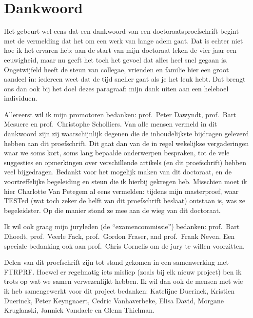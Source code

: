 \documentclass[main]{subfiles}
\begin{document}

\chapter{Dankwoord}\label{ch:dankwoord}

Het gebeurt wel eens dat een dankwoord van een doctoraatsproefschrift begint met de vermelding dat het om een werk van lange adem gaat.
Dat is echter niet hoe ik het ervaren heb: aan de start van mijn doctoraat leken de vier jaar een eeuwigheid, maar nu geeft het toch het gevoel dat alles heel snel gegaan is.
Ongetwijfeld heeft de steun van collegae, vrienden en familie hier een groot aandeel in: iedereen weet dat de tijd sneller gaat als je het leuk hebt.
Dat brengt ons dan ook bij het doel dezes paragraaf: mijn dank uiten aan een heleboel individuen.

Allereerst wil ik mijn promotoren bedanken: prof.\ Peter Dawyndt, prof.\ Bart Mesuere en prof.\ Christophe Scholliers.
Van alle mensen vermeld in dit dankwoord zijn zij waarschijnlijk degenen die de inhoudelijkste bijdragen geleverd hebben aan dit proefschrift.
Dit gaat dan van de in regel wekelijkse vergaderingen waar we soms kort, soms lang bepaalde onderwerpen bespraken, tot de vele suggesties en opmerkingen over verschillende artikels (en dit proefschrift) hebben veel bijgedragen.
Bedankt voor het mogelijk maken van dit doctoraat, en de voortreffelijke begeleiding en steun die ik hierbij gekregen heb.
Misschien moet ik hier Charlotte Van Petegem al eens vermelden: tijdens mijn masterproef, waar TESTed (wat toch zeker de helft van dit proefschrift beslaat) ontstaan is, was ze begeleidster.
Op die manier stond ze mee aan de wieg van dit doctoraat.

Ik wil ook graag mijn juryleden (de ``examencommissie'') bedanken: prof.\ Bart Dhoedt, prof.\ Veerle Fack, prof.\ Gordon Fraser, and prof.\ Frank Neven.
Een speciale bedanking ook aan prof.\ Chris Cornelis om de jury te willen voorzitten.

Delen van dit proefschrift zijn tot stand gekomen in een samenwerking met FTRPRF\@.
Hoewel er regelmatig iets misliep (zoals bij elk nieuw project) ben ik trots op wat we samen verwezenlijkt hebben.
Ik wil dan ook de mensen met wie ik heb samengewerkt voor dit project bedanken: Katelijne Duerinck, Kristien Duerinck, Peter Keyngnaert, Cedric Vanhaverbeke, Elisa David, Morgane Kruglanski, Jannick Vandaele en Glenn Thielman.
\end{document}
